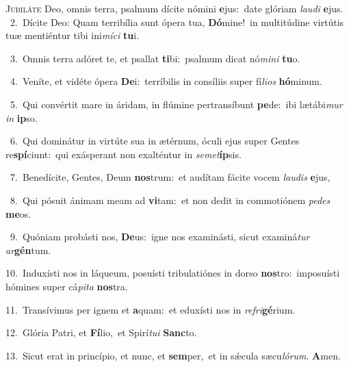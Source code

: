 \lettrine{\initial\textcolor{\initialcolor}{J}}{ubiláte} Deo, omnis terra, psalmum dícite nómini \textbf{e}\-jus:~\star date glóriam \textit{lau}\-\textit{di} \textbf{e}\-jus.\\
{\numbfont\textcolor{\numbcolor}{~2.}}~Dícite Deo: Quam terribília sunt ópera tua, \textbf{Dó}\-mine!~\star in multitúdine virtútis tuæ mentiéntur tibi ini\-\textit{mí}\-\textit{ci} \textbf{tu}\-i.\par
{\numbfont\textcolor{\numbcolor}{~3.}}~Omnis terra adóret te, et psallat \textbf{ti}\-bi:~\star psalmum dicat nó\-\textit{mi}\-\textit{ni} \textbf{tu}\-o.\par
{\numbfont\textcolor{\numbcolor}{~4.}}~Veníte, et vidéte ópera \textbf{De}\-i:~\star terríbilis in consíliis super fí\-\textit{li}\-\textit{os} \textbf{hó}\-minum.\par
{\numbfont\textcolor{\numbcolor}{~5.}}~Qui convértit mare in áridam, in flúmine pertransíbunt \textbf{pe}\-de:~\star ibi lætábi\textit{mur} \textit{in} \textbf{ip}\-so.\par
{\numbfont\textcolor{\numbcolor}{~6.}}~Qui dominátur in virtúte sua in ætérnum, óculi ejus super Gentes re\-\textbf{spí}\-ciunt:~\star qui exásperant non exalténtur in \textit{se}\-\textit{met}\textbf{íp}sis.\par
{\numbfont\textcolor{\numbcolor}{~7.}}~Benedícite, Gentes, Deum \textbf{nos}\-trum:~\star et audítam fácite vocem \textit{lau}\-\textit{dis} \textbf{e}\-jus,\par
{\numbfont\textcolor{\numbcolor}{~8.}}~Qui pósuit ánimam meam ad \textbf{vi}\-tam:~\star et non dedit in commotiónem \textit{pe}\-\textit{des} \textbf{me}\-os.\par
{\numbfont\textcolor{\numbcolor}{~9.}}~Quóniam probásti nos, \textbf{De}\-us:~\star igne nos examinásti, sicut examiná\textit{tur} \textit{ar}\-\textbf{gén}tum.\par
{\numbfont\textcolor{\numbcolor}{10.}}~Induxísti nos in láqueum, posuísti tribulatiónes in dorso \textbf{nos}\-tro:~\star imposuísti hómines super cá\-\textit{pi}\-\textit{ta} \textbf{nos}\-tra.\par
{\numbfont\textcolor{\numbcolor}{11.}}~Transívimus per ignem et \textbf{a}\-quam:~\star et eduxísti nos in \textit{re}\-\textit{fri}\textbf{gé}rium.\par
{\numbfont\textcolor{\numbcolor}{12.}}~Glória Patri, et \textbf{Fí}\-lio,~\star et Spirí\-\textit{tu}\-\textit{i} \textbf{Sanc}\-to.\par
{\numbfont\textcolor{\numbcolor}{13.}}~Sicut erat in princípio, et nunc, et \textbf{sem}\-per,~\star et in sǽcula sæcu\-\textit{ló}\-\textit{rum}. \textbf{A}\-men.\par
